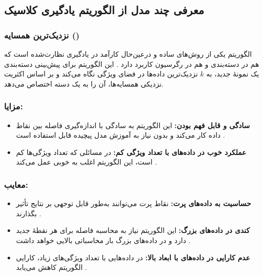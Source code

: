 \subsection{معرفی چند مدل از الگوریتم یادگیری کلاسیک}

\subsubsection{نزدیک‌ترین همسایه ()}
الگوریتم  یکی از روش‌های ساده و درعین‌حال کارآمد در یادگیری نظارت‌شده است که هم در دسته‌بندی و هم در رگرسیون کاربرد دارد
\cite{cover1967nearest,duda1973pattern,mitchell1997machine}.
این الگوریتم برای پیش‌بینی دسته‌بندی یک نمونهٔ جدید، به $k$ نزدیک‌ترین داده‌ها در فضای ویژگی نگاه می‌کند و بر اساس اکثریت نزدیکی همسایه‌ها، آن را به یک دسته اختصاص می‌دهد. 

\subsubsection{مزایا:}
\begin{itemize}
	\item \textbf{سادگی و قابل فهم بودن:}  
	این الگوریتم به سادگی با اندازه‌گیری فاصله بین نقاط داده کار می‌کند و بدون نیاز به آموزش مدل پیچیده قابل استفاده است
	\cite{cover1967nearest}.
	\item \textbf{عملکرد خوب در داده‌های با تعداد ویژگی کم:}  
	در مسائلی که تعداد ویژگی‌ها کم است، این الگوریتم اغلب به خوبی عمل می‌کند
	\cite{james2013introduction}.
\end{itemize}

\subsubsection{معایب:}
\begin{itemize}
	\item \textbf{حساسیت به داده‌های پرت:}  
	نقاط پرت می‌توانند به‌طور قابل توجهی بر نتایج تأثیر بگذارند
	\cite{duda1973pattern}.
	\item \textbf{کندی در داده‌های بزرگ:}  
	این الگوریتم نیاز به محاسبه فاصله برای هر نقطهٔ جدید دارد و در داده‌های بزرگ بار محاسباتی بالایی خواهد داشت
	\cite{mitchell1997machine}.
	\item \textbf{عدم کارایی در داده‌های با ابعاد بالا:}  
	در داده‌هایی با تعداد ویژگی‌های زیاد، کارایی الگوریتم کاهش می‌یابد \cite{murphy2012machine}.
\end{itemize}



